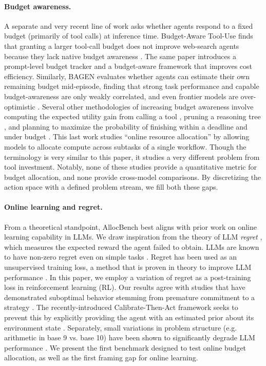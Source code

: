 \documentclass{article}
\begin{document}
\paragraph{Budget awareness.} A separate and very recent line of work asks whether agents respond to a fixed budget (primarily of tool calls) at inference time. Budget-Aware Tool-Use finds that granting a larger tool-call budget does not improve web-search agents because they lack native budget awareness \citep{liu2025budgetaware}. The same paper introduces a prompt-level budget tracker and a
budget-aware framework that improves cost efficiency. Similarly, BAGEN evaluates whether agents can estimate their own remaining budget mid-episode, finding that strong task
performance and capable budget-awareness are only weakly correlated, and even frontier models are over-optimistic \citep{lin2026bagen}. Several other methodologies of increasing budget awareness involve computing the expected utility gain from calling a tool \citep{liu2026utility}, pruning a reasoning tree \citep{li2026bavt}, and planning to maximize the probability of finishing within a deadline and under budget \citep{wang2026mcpp}. This last work studies ``online resource allocation'' by allowing models to allocate compute across
subtasks of a single workflow. Though the terminology is very similar to this paper, it studies a very different problem from tool investment. Notably, none of these studies provide a quantitative metric for budget allocation, and none provide cross-model comparisons. By discretizing the action space with a defined problem stream, we fill both these gaps.

\paragraph{Online learning and regret.} From a theoretical standpoint, AllocBench best aligns with prior work on online learning capability in LLMs. We draw inspiration from the theory of LLM \textit{regret} \citep{park2025regret}, which measures the expected reward the agent failed to obtain. LLMs are known to have non-zero regret even on simple tasks \citep{park2025regret}. Regret has been used as an unsupervised training loss, a method that is proven in theory to improve LLM performance \citep{park2025regret}. In this paper, we employ a variation of regret as a post-training loss in reinforcement learning (RL). Our results agree with studies that have demonstrated suboptimal behavior stemming from premature commitment to a strategy \citep{chen2025greedy, mehta2026commit}. The recently-introduced Calibrate-Then-Act framework seeks to prevent this by explicitly providing the agent with an estimated prior about its environment state \citep{ding2026calibrate}.  Separately, small variations in problem structure (e.g. arithmetic in base 9 vs. base 10) have been shown to significantly degrade LLM performance \citep{wu2024counterfactual}. We present the first benchmark designed to test online budget allocation, as well as the first framing gap for online learning.
\end{document}
